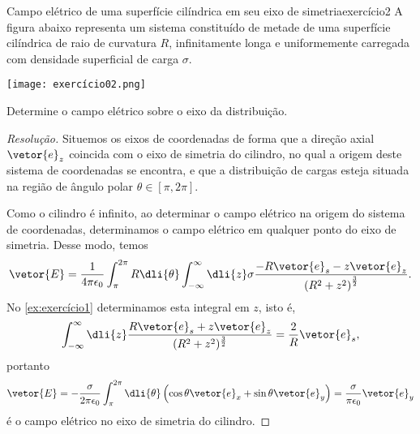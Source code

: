 \begin{exercício}{Campo elétrico de uma superfície cilíndrica em seu eixo de simetria}{exercício2}
    A figura abaixo representa um sistema constituído de metade de uma superfície cilíndrica de raio de curvatura \(R\), infinitamente longa e uniformemente carregada com densidade superficial de carga \(\sigma\).
    \begin{center}
        \texttt{[image: exercício02.png]}
    \end{center}
    Determine o campo elétrico sobre o eixo da distribuição.
\end{exercício}
\begin{proof}[Resolução]
    Situemos os eixos de coordenadas de forma que a direção axial \(\vetor{e}_z\) coincida com o eixo de simetria do cilindro, no qual a origem deste sistema de coordenadas se encontra, e que a distribuição de cargas esteja situada na região de ângulo polar \(\theta \in [\pi, 2\pi]\).

    Como o cilindro é infinito, ao determinar o campo elétrico na origem do sistema de coordenadas, determinamos o campo elétrico em qualquer ponto do eixo de simetria. Desse modo, temos
    \begin{equation*}
        \vetor{E} = \frac{1}{4\pi \epsilon_0} \int_\pi^{2\pi} R\dli{\theta} \int_{-\infty}^{\infty} \dli{z} \sigma \frac{-R \vetor{e}_s - z\vetor{e}_z}{\left(R^2 + z^2\right)^{\frac32}}.
    \end{equation*}
    No \cref{ex:exercício1} determinamos esta integral em \(z\), isto é,
    \begin{equation*}
        \int_{-\infty}^\infty \dli{z} \frac{R \vetor{e}_s + z \vetor{e}_z}{(R^2 + z^2)^{\frac32}} = \frac{2}{R}\vetor{e}_s,
    \end{equation*}
    portanto
    \begin{equation*}
        \vetor{E} = -\frac{\sigma}{2\pi \epsilon_0} \int_{\pi}^{2\pi} \dli{\theta} \left(\cos\theta\vetor{e}_x + \sin\theta \vetor{e}_y\right) = \frac{\sigma}{\pi \epsilon_0}\vetor{e}_y
    \end{equation*}
    é o campo elétrico no eixo de simetria do cilindro.
\end{proof}
